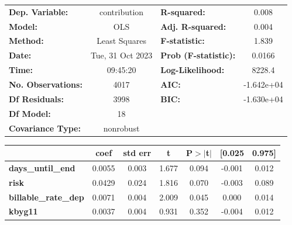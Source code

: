 \begin{center}
\begin{tabular}{lclc}
\toprule
\textbf{Dep. Variable:}                     &   contribution   & \textbf{  R-squared:         } &     0.008   \\
\textbf{Model:}                             &       OLS        & \textbf{  Adj. R-squared:    } &     0.004   \\
\textbf{Method:}                            &  Least Squares   & \textbf{  F-statistic:       } &     1.839   \\
\textbf{Date:}                              & Tue, 31 Oct 2023 & \textbf{  Prob (F-statistic):} &   0.0166    \\
\textbf{Time:}                              &     09:45:20     & \textbf{  Log-Likelihood:    } &    8228.4   \\
\textbf{No. Observations:}                  &        4017      & \textbf{  AIC:               } & -1.642e+04  \\
\textbf{Df Residuals:}                      &        3998      & \textbf{  BIC:               } & -1.630e+04  \\
\textbf{Df Model:}                          &          18      & \textbf{                     } &             \\
\textbf{Covariance Type:}                   &    nonrobust     & \textbf{                     } &             \\
\bottomrule
\end{tabular}
\begin{tabular}{lcccccc}
                                            & \textbf{coef} & \textbf{std err} & \textbf{t} & \textbf{P$> |$t$|$} & \textbf{[0.025} & \textbf{0.975]}  \\
\midrule
\textbf{days\_until\_end}                   &       0.0055  &        0.003     &     1.677  &         0.094        &       -0.001    &        0.012     \\
\textbf{risk}                               &       0.0429  &        0.024     &     1.816  &         0.070        &       -0.003    &        0.089     \\
\textbf{billable\_rate\_dep}                &       0.0071  &        0.004     &     2.009  &         0.045        &        0.000    &        0.014     \\
\textbf{kbyg11}                             &       0.0037  &        0.004     &     0.931  &         0.352        &       -0.004    &        0.012     \\

\end{tabular}
\end{center}
